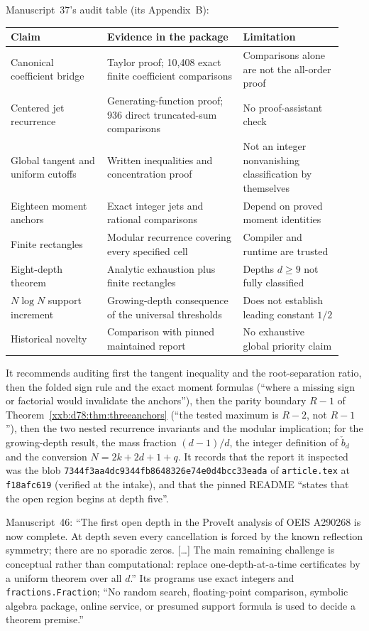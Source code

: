 \documentclass[11pt,a4paper]{article}
\numberwithin{equation}{section}
\theoremstyle{definition}
\theoremstyle{remark}
\theoremstyle{plain}
\begin{document}
Manuscript~37's audit table (its Appendix~B):
\begin{center}
\small
\begin{tabular}{@{}p{0.27\linewidth}p{0.38\linewidth}p{0.28\linewidth}@{}}
\toprule
Claim & Evidence in the package & Limitation\\
\midrule
Canonical coefficient bridge & Taylor proof; 10,408 exact finite coefficient comparisons & Comparisons alone are not the all-order proof\\
Centered jet recurrence & Generating-function proof; 936 direct truncated-sum comparisons & No proof-assistant check\\
Global tangent and uniform cutoffs & Written inequalities and concentration proof & Not an integer nonvanishing classification by themselves\\
Eighteen moment anchors & Exact integer jets and rational comparisons & Depend on proved moment identities\\
Finite rectangles & Modular recurrence covering every specified cell & Compiler and runtime are trusted\\
Eight-depth theorem & Analytic exhaustion plus finite rectangles & Depths $d\ge9$ not fully classified\\
$N\log N$ support increment & Growing-depth consequence of the universal thresholds & Does not establish leading constant $1/2$\\
Historical novelty & Comparison with pinned maintained report & No exhaustive global priority claim\\
\bottomrule
\end{tabular}
\end{center}
It recommends auditing first the tangent inequality and the root-separation
ratio, then the folded sign rule and the exact moment formulas (``where a
missing sign or factorial would invalidate the anchors''), then the parity
boundary $R-1$ of Theorem~\ref{xxb:d78:thm:threeanchors} (``the tested maximum
is $R-2$, not $R-1$''), then the two nested recurrence invariants and the
modular implication; for the growing-depth result, the mass fraction
$(d-1)/d$, the integer definition of $\check b_d$ and the conversion
$N=2k+2d+1+q$.  It records that the report it inspected was the blob
\texttt{7344f3aa4dc9344fb8648326e74e0d4bcc33eada} of \texttt{article.tex} at
\texttt{f18afc619} (verified at the intake), and that the pinned README ``states
that the open region begins at depth five''.

Manuscript~46: ``The first open depth in the ProveIt analysis of OEIS A290268
is now complete.  At depth seven every cancellation is forced by the known
reflection symmetry; there are no sporadic zeros.  [\ldots]  The main remaining
challenge is conceptual rather than computational: replace
one-depth-at-a-time certificates by a uniform theorem over all $d$.''  Its
programs use exact integers and \texttt{fractions.Fraction}; ``No random search,
floating-point comparison, symbolic algebra package, online service, or presumed
support formula is used to decide a theorem premise.''
\end{document}

